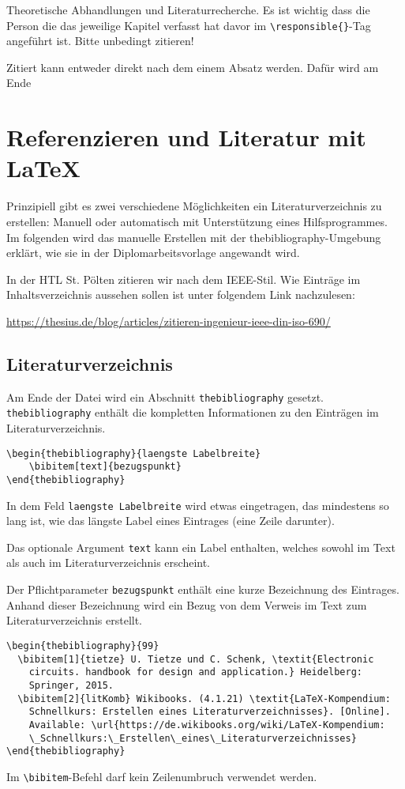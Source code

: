
Theoretische Abhandlungen und Literaturrecherche. Es ist wichtig dass die Person die das jeweilige Kapitel verfasst hat davor im \verb|\responsible{}|-Tag angeführt ist. Bitte unbedingt zitieren!

Zitiert kann entweder direkt nach dem einem Absatz werden. Dafür wird am Ende

\section{Referenzieren und Literatur mit \LaTeX}
Prinzipiell gibt es zwei verschiedene Möglichkeiten ein Literaturverzeichnis zu erstellen: Manuell oder automatisch mit Unterstützung eines Hilfsprogrammes. Im folgenden wird das manuelle Erstellen mit der thebibliography-Umgebung erklärt, wie sie in der Diplomarbeitsvorlage angewandt wird. \cite{litKomb}

In der HTL St. Pölten zitieren wir nach dem IEEE-Stil. Wie Einträge im Inhaltsverzeichnis aussehen sollen ist unter folgendem Link nachzulesen:

\url{https://thesius.de/blog/articles/zitieren-ingenieur-ieee-din-iso-690/}

\subsection{Literaturverzeichnis}
Am Ende der Datei wird ein Abschnitt \verb|thebibliography| gesetzt. \verb|thebibliography| enthält die kompletten Informationen zu den Einträgen im Literaturverzeichnis.
\begin{Verbatim}[frame=single]
\begin{thebibliography}{laengste Labelbreite}
	\bibitem[text]{bezugspunkt}
\end{thebibliography}
\end{Verbatim}
In dem Feld \verb|laengste Labelbreite| wird etwas eingetragen, das mindestens so lang ist, wie das längste Label eines Eintrages (eine Zeile darunter).

Das optionale Argument \verb|text| kann ein Label enthalten, welches sowohl im Text als auch im Literaturverzeichnis erscheint.

Der Pflichtparameter \verb|bezugspunkt| enthält eine kurze Bezeichnung des Eintrages. Anhand dieser Bezeichnung wird ein Bezug von dem Verweis im Text zum Literaturverzeichnis erstellt.
\begin{Verbatim}[frame=single]
\begin{thebibliography}{99}
  \bibitem[1]{tietze} U. Tietze und C. Schenk, \textit{Electronic 
    circuits. handbook for design and application.} Heidelberg: 
    Springer, 2015.
  \bibitem[2]{litKomb} Wikibooks. (4.1.21) \textit{LaTeX-Kompendium: 
    Schnellkurs: Erstellen eines Literaturverzeichnisses}. [Online]. 
    Available: \url{https://de.wikibooks.org/wiki/LaTeX-Kompendium:
    \_Schnellkurs:\_Erstellen\_eines\_Literaturverzeichnisses}
\end{thebibliography}
\end{Verbatim}
Im \verb|\bibitem|-Befehl darf kein Zeilenumbruch verwendet werden.

